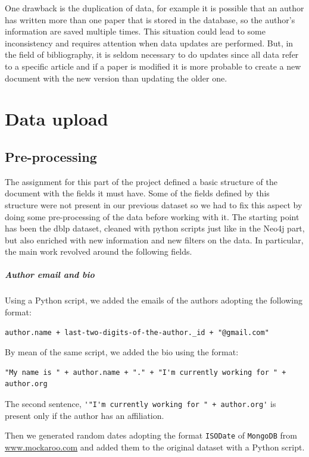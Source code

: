 One drawback is the duplication of data, for example it is possible that an author has written more than one paper that is stored in the database, so the author's information are saved multiple times.
This situation could lead to some inconsistency and requires attention when data updates are performed.
But, in the field of bibliography, it is seldom necessary to do updates since all data refer to a specific article and if a paper is modified it is more probable to create a new document with the new version than updating the older one.


\chapter{Data upload}
\label{ch:data_upload_mongodb}%


\section{Pre-processing}
\label{sec:pre_processing_mongodb}%
The assignment for this part of the project defined a basic structure of the document with the fields it must have.
Some of the fields defined by this structure were not present in our previous dataset so we had to fix this aspect by doing some pre-processing of the data before working with it.
The starting point has been the dblp dataset, cleaned with python scripts just like in the Neo4j part, but also enriched with new information and new filters on the data.
In particular, the main work revolved around the following fields.

\paragraph{Author email and bio}
Using a Python script, we added the emails of the authors adopting the following format:
\begin{lstlisting}[label={lst:lstlisting52}]
author.name + last-two-digits-of-the-author._id + "@gmail.com"
\end{lstlisting}
By mean of the same script, we added the bio using the format:
\begin{lstlisting}[label={lst:lstlisting53}]
"My name is " + author.name + "." + "I'm currently working for " + author.org
\end{lstlisting}
The second sentence, \verb|'"I'm currently working for " + author.org'| is present only if the author has an affiliation.

Then we generated random dates adopting the format \verb|ISODate| of \verb|MongoDB| from\\ \href{https://www.mockaroo.com}{www.mockaroo.com} and added them to the original dataset with a Python script.

